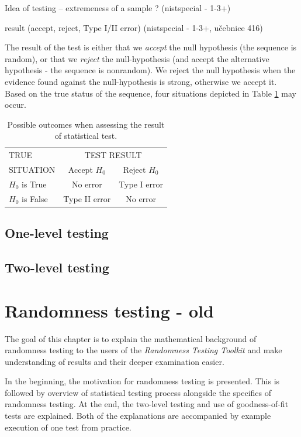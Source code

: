 \documentclass[
  digital,     %
  oneside,     %
  nosansbold,  %
  nocolorbold, %
  nolof,         %
  nolot,         %
]{fithesis4}
\begin{document}
Idea of testing – extremeness of a sample ? (nistspecial - 1-3+)

result (accept, reject, Type I/II error) (nistspecial - 1-3+, učebnice 416)

The result of the test is either that we \emph{accept} the null hypothesis (the sequence is random), or that we \emph{reject} the null-hypothesis (and accept the alternative hypothesis - the sequence is nonrandom). We reject the null hypothesis when the evidence found against the null-hypothesis is strong, otherwise we accept it. Based on the true status of the sequence, four situations depicted in Table \ref{tab:type_errors} may occur.

\begin{table}
  \begin{tabularx}{0.7\textwidth}{l|c|c}
    TRUE  & \multicolumn{2}{c}{TEST RESULT}\\
    SITUATION &Accept $H_0$ & Reject $H_0$\\
    \midrule
    $H_0$ is True &  No error & Type I error  \\
    $H_0$ is False & Type II error & No error \\
  \end{tabularx}
  \caption{Possible outcomes when assessing the result of statistical test.}
  \label{tab:type_errors}
\end{table}




\section{One-level testing}

\section{Two-level testing}



\chapter{Randomness testing - old}

The goal of this chapter is to explain the mathematical background of randomness testing to the users of the \emph{Randomness Testing Toolkit} and make understanding of results and their deeper examination easier.

In the beginning, the motivation for randomness testing is presented. This is followed by overview of statistical testing process alongside the specifics of randomness testing. At the end, the two-level testing and use of goodness-of-fit tests are explained. Both of the explanations are accompanied by example execution of one test from practice. 
\end{document}
